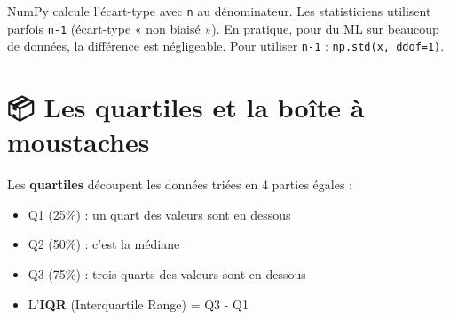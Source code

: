 \documentclass[
  french,
  11pt,
  a4paper,
]{scrbook}
\providecommand{\tightlist}{%
  \setlength{\itemsep}{0pt}\setlength{\parskip}{0pt}}
\begin{document}
\begin{tcolorbox}[enhanced jigsaw, arc=.35mm, bottomrule=.15mm, bottomtitle=1mm, breakable, colback=white, colbacktitle=quarto-callout-warning-color!10!white, colframe=quarto-callout-warning-color-frame, coltitle=black, left=2mm, leftrule=.75mm, opacityback=0, opacitybacktitle=0.6, rightrule=.15mm, title=\textcolor{quarto-callout-warning-color}{\faExclamationTriangle}\hspace{0.5em}{⚠️ Attention : std de NumPy vs std de stats}, titlerule=0mm, toprule=.15mm, toptitle=1mm]

NumPy calcule l'écart-type avec \texttt{n} au dénominateur. Les
statisticiens utilisent parfois \texttt{n-1} (écart-type « non biaisé
»). En pratique, pour du ML sur beaucoup de données, la différence est
négligeable. Pour utiliser \texttt{n-1} : \texttt{np.std(x,\ ddof=1)}.

\end{tcolorbox}

\section{📦 Les quartiles et la boîte à
moustaches}\label{les-quartiles-et-la-bouxeete-uxe0-moustaches}

Les \textbf{quartiles} découpent les données triées en 4 parties égales
:

\begin{itemize}
\tightlist
\item
  Q1 (25\%) : un quart des valeurs sont en dessous
\item
  Q2 (50\%) : c'est la médiane
\item
  Q3 (75\%) : trois quarts des valeurs sont en dessous
\item
  L'\textbf{IQR} (Interquartile Range) = Q3 - Q1
\end{itemize}
\end{document}
